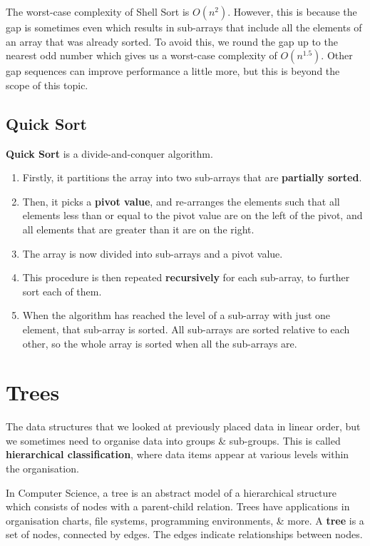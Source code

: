 \documentclass[11pt]{article}
\begin{document}
The worst-case complexity of Shell Sort is $O(n^2)$.
However, this is because the gap is sometimes even which results in sub-arrays that include all the elements of an array that was already sorted.
To avoid this, we round the gap up to the nearest odd number which gives us a worst-case complexity of $O(n^{1.5})$.
Other gap sequences can improve performance a little more, but this is beyond the scope of this topic.

\subsection{Quick Sort}
\textbf{Quick Sort} is a divide-and-conquer algorithm. 
\begin{enumerate}
    \item   Firstly, it partitions the array into two sub-arrays that are \textbf{partially sorted}. 
    \item   Then, it picks a \textbf{pivot value}, and re-arranges the elements such that all elements less than or equal to the pivot value are on the left of the pivot, and all elements that are greater than 
            it are on the right.
    \item   The array is now divided into sub-arrays and a pivot value. 
    \item   This procedure is then repeated \textbf{recursively} for each sub-array, to further sort each of them.
    \item   When the algorithm has reached the level of a sub-array with just one element, that sub-array is sorted.
            All sub-arrays are sorted relative to each other, so the whole array is sorted when all the sub-arrays are.
\end{enumerate}

\section{Trees}
The data structures that we looked at previously placed data in linear order, but we sometimes need to organise data into groups \& sub-groups.
This is called \textbf{hierarchical classification}, where data items appear at various levels within the organisation.

In Computer Science, a tree is an abstract model of a hierarchical structure which consists of nodes with a parent-child relation. 
Trees have applications in organisation charts, file systems, programming environments, \& more.
A \textbf{tree} is a set of nodes, connected by edges. 
The edges indicate relationships between nodes.
\end{document}
